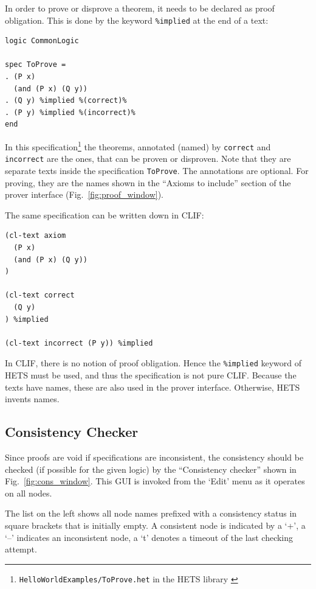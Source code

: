\documentclass{article}
\newcommand{\normalTEXTSC}[2]{{#1\scriptsize#2}}
\newcommand     {\Hets}{\normalTEXTSC{H}{ETS}\xspace}
\begin{document}
In order to prove or disprove a theorem, it needs to be declared as proof 
obligation. This is done by the keyword \texttt{\%implied} at the end of a text:

\begin{lstlisting}[language=hetcasl,alsolanguage=clif]
logic CommonLogic

spec ToProve =
. (P x)
  (and (P x) (Q y))
. (Q y) %implied %(correct)%
. (P y) %implied %(incorrect)%
end
\end{lstlisting}

In this specification\footnote{\texttt{HelloWorldExamples/ToProve.het} in the \Hets library \cite{hets-library:URL}} the theorems, annotated (named) by \texttt{correct} and 
\texttt{incorrect} are the ones, that can be proven or disproven.
Note that they are separate texts inside the specification \texttt{ToProve}.
The annotations are optional. For proving, they are the names shown in the 
``Axioms to include'' section of the prover interface 
(Fig.~\ref{fig:proof_window}).

The same specification can be written down in CLIF:
\begin{lstlisting}[language=clif,morekeywords={implied}]
(cl-text axiom
  (P x)
  (and (P x) (Q y))
)

(cl-text correct
  (Q y)
) %implied

(cl-text incorrect (P y)) %implied
\end{lstlisting}
In CLIF, there is no notion of proof obligation. Hence the \texttt{\%implied} 
keyword of \Hets must be used, and thus the specification is not pure CLIF. Because the texts have 
names, these are also used in the prover interface. Otherwise, \Hets invents 
names.

\subsection{Consistency Checker}
\label{sec:CC}
Since proofs are void if specifications are inconsistent, the consistency
should be checked (if possible for the given logic) by the ``Consistency
checker'' shown in Fig.~\ref{fig:cons_window}.  This GUI is invoked from
the `Edit' menu as it operates on all nodes.

The list on the left shows all node names prefixed with a consistency status
in square brackets that is initially empty.  A consistent node is indicated by
a `+', a `–' indicates an inconsistent node, a `t' denotes a timeout of the last
checking attempt.
\end{document}
